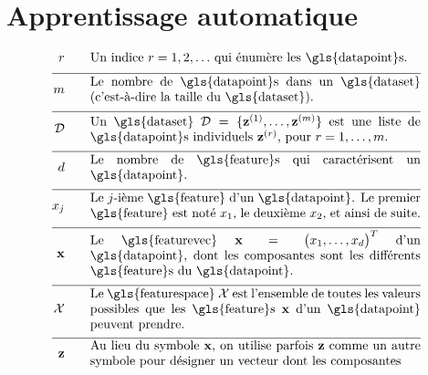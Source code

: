 \newpage
\section*{Apprentissage automatique}

\begin{align}
	\sampleidx \quad\quad & \parbox{.75\textwidth}{Un indice $\sampleidx=1,2,\ldots$ qui énumère les \gls{datapoint}s.}   \nonumber \\[2mm] \hline \nonumber\\[-5mm]
	\samplesize \quad\quad &\parbox{.75\textwidth}{Le nombre de \gls{datapoint}s dans un \gls{dataset} (c’est-à-dire la taille du \gls{dataset}).} \nonumber \\[2mm] \hline \nonumber\\[-5mm] 
	\dataset \quad\quad & \parbox{.75\textwidth}{Un \gls{dataset} $\dataset = \{ \datapoint^{(1)},\ldots, \datapoint^{(\samplesize)} \}$ 
		est une liste de \gls{datapoint}s individuels $\datapoint^{(\sampleidx)}$, pour $\sampleidx=1,\ldots,\samplesize$.}   \nonumber \\[2mm] \hline \nonumber\\[-5mm]
	\featurelen \quad\quad &\parbox{.75\textwidth}{Le nombre de \gls{feature}s qui caractérisent un \gls{datapoint}.}\nonumber \\[2mm] \hline \nonumber\\[-5mm]
	\feature_{\featureidx} \quad\quad &\parbox{.75\textwidth}{Le $\featureidx$-ième \gls{feature} d’un \gls{datapoint}. Le premier \gls{feature} 
		est noté $\feature_{1}$, le deuxième $\feature_{2}$, et ainsi de suite. } \nonumber \\[2mm] \hline \nonumber\\[-5mm] 
	\featurevec \quad\quad &\parbox{.75\textwidth}{Le \gls{featurevec} $\featurevec=\big(\feature_{1},\ldots,\feature_{\featuredim}\big)^{T}$ d’un \gls{datapoint}, dont les composantes 
		sont les différents \gls{feature}s du \gls{datapoint}.}\nonumber \\[2mm] \hline \nonumber\\[-5mm]
	\featurespace \quad\quad & \parbox{.75\textwidth}{Le \gls{featurespace} $\featurespace$ est 
		l’ensemble de toutes les valeurs possibles que les \gls{feature}s $\featurevec$ d’un \gls{datapoint} peuvent prendre.} \nonumber \\[2mm] \hline \nonumber\\[-5mm]
	\rawfeaturevec \quad\quad &\parbox{.75\textwidth}{Au lieu du symbole $\featurevec$, on utilise parfois $\rawfeaturevec$ comme un autre symbole pour désigner un vecteur dont les composantes 
}
\end{align}
